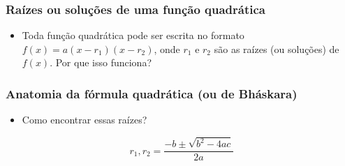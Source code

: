 \documentclass[usenames,dvipsnames,svgnames]{beamer}
\begin{document}
\begin{frame}
	\frametitle{Raízes ou soluções de uma função quadrática}

	\begin{itemize}
		\item Toda função quadrática pode ser escrita no formato $f(x) = a(x-r_1)(x-r_2)$, onde $r_1$ e $r_2$ são as raízes (ou soluções) de $f(x)$. Por que isso funciona?
	\end{itemize}

\end{frame}

\begin{frame}
	\frametitle{Anatomia da fórmula quadrática (ou de Bháskara)}

	\begin{itemize}
		\item Como encontrar essas raízes?
	\end{itemize}

	\begin{equation}
		r_1, r_2 = \frac{-b \pm \sqrt{b^2-4ac}}{2a}
	\end{equation}

	\begin{adjustbox}{max totalsize={\textwidth}{.6\textheight},center}
	\end{adjustbox}

\end{frame}
\end{document}
